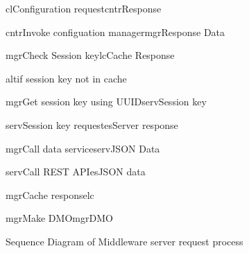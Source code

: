\begin{figure}[h]
\begin{center}

	\resizebox{1.0\textwidth}{0.7\textwidth} {

	\begin{sequencediagram}

	\begin{call}{cl}{Configuration request}{cntr}{Response}

		\begin{call}{cntr}{Invoke configuation manager}{mgr}{Response Data}
			\begin{call}{mgr}{Check Session key}{lc}{Cache Response}\end{call}
			\begin{sdblock}{alt}{if session key not in cache}
				\begin{call}{mgr}{Get session key using UUID}{serv}{Session key}
					\begin{call}{serv}{Session key request}{es}{Server response}
					\end{call}
				\end{call}
			\end{sdblock}
			\begin{call}{mgr}{Call data service}{serv}{JSON Data}
				\begin{call}{serv}{Call REST API}{es}{JSON data}
				\end{call}
			\end{call}
			\begin{call}{mgr}{Cache response}{lc}{}
			\end{call}
			\begin{call}{mgr}{Make DMO}{mgr}{DMO}\end{call}
		\end{call}

	\end{call}

	\end{sequencediagram}
	}

\end{center}
\caption{Sequence Diagram of Middleware server request process}
\label{fig:arch_uml}
\end{figure}

